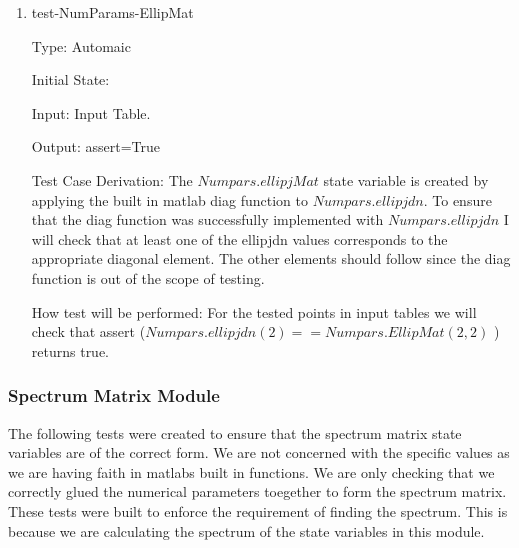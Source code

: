 \documentclass[12pt, titlepage]{article}
\begin{document}
\begin{enumerate}
\item{test-NumParams-EllipMat\\}

Type: Automaic

Initial State: 

Input: Input Table.

Output: assert=True

Test Case Derivation: The $Numpars.ellipjMat$ state variable is created by 
applying the built in matlab diag function to $Numpars.ellipjdn$. To ensure 
that the diag function was successfully implemented with $Numpars.ellipjdn$ I 
will check that at least one of the ellipjdn values corresponds to the 
appropriate diagonal element. The other elements should follow since the diag 
function is out of the scope of testing. 

How test will be performed: For the tested points in input tables we will 
check that assert 
($Numpars.ellipjdn(2)==Numpars.EllipMat(2,2)$ ) returns true. 
\end{enumerate} 

\subsubsection{Spectrum Matrix Module}

The following tests were created to ensure that the spectrum matrix state 
variables are of the correct form. We are not concerned with the specific 
values as we are having faith in matlabs built in functions. We are only 
checking that we correctly glued the numerical parameters toegether to form the 
spectrum matrix. \\ 
These tests were built to enforce the requirement of finding the spectrum. This 
is because we are calculating the spectrum of the state variables in this 
module. \\ 


\end{document}
